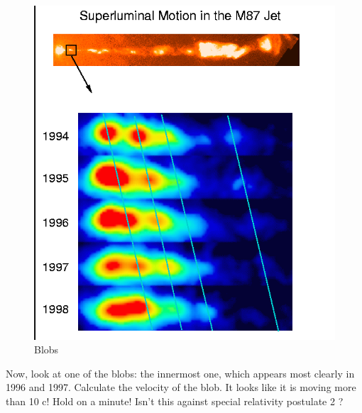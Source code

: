 \documentclass[10pt,a4paper]{article}
\begin{document}
\begin{figure}[htbp]
\centering
\includegraphics[scale=0.25]{lum1.png} 
\caption{Blobs}
\end{figure}
Now, look at one of the blobs: the innermost one, which appears most clearly in 1996 and 1997.
Calculate the velocity of the blob. It looks like it is moving more than 10 c!
Hold on a minute! Isn’t this against special relativity postulate 2 ?
\end{document}
